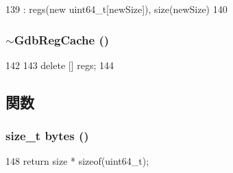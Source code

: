 \begin{DoxyCode}
139                                     : regs(new uint64_t[newSize]), size(newSize)
140         {}
\end{DoxyCode}
\hypertarget{classBaseRemoteGDB_1_1GdbRegCache_a62fbac449c276f439b75391b0068fd77}{
\subsubsection[{$\sim$GdbRegCache}]{\setlength{\rightskip}{0pt plus 5cm}$\sim${\bf GdbRegCache} ()}}
\label{classBaseRemoteGDB_1_1GdbRegCache_a62fbac449c276f439b75391b0068fd77}



\begin{DoxyCode}
142         {
143             delete [] regs;
144         }
\end{DoxyCode}


\subsection{関数}
\hypertarget{classBaseRemoteGDB_1_1GdbRegCache_af5dc21741defa890c1d21c1071c7ea72}{
\subsubsection[{bytes}]{\setlength{\rightskip}{0pt plus 5cm}size\_\-t bytes ()}}
\label{classBaseRemoteGDB_1_1GdbRegCache_af5dc21741defa890c1d21c1071c7ea72}



\begin{DoxyCode}
148 { return size * sizeof(uint64_t); }
\end{DoxyCode}


